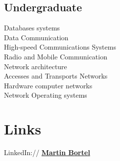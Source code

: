\documentclass[letterpaper]{deedy-resume.en} %
\begin{document}
\begin{minipage}[t]{0.39\textwidth}
\sectionspace %


\subsection{Undergraduate}

Databases systems \\
Data Communication \\
High-speed Communications Systems \\
Radio and Mobile Communication \\
Network architecture \\
Accesses and Transports Networks \\
Hardware computer networks \\
Network Operating systems

\sectionspace %

\section{Links} 

LinkedIn:// \href{https://www.linkedin.com/in/martin-bortel-326b5227/}{\bf Martin Bortel} \\

\sectionspace %
\end{minipage} %
\hfill
%
\end{document}
